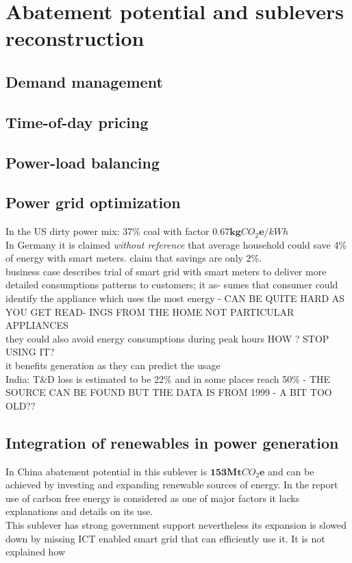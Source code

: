 \documentclass[11pt, twocolumn]{article}
\begin{document}
\section{Abatement potential and sublevers reconstruction}
\subsection{Demand management}
\subsection{Time-of-day pricing}
\subsection{Power-load balancing}
\subsection{Power grid optimization}

In the US dirty power mix: 37\% coal with factor $\mathbf{0.67} \mathbf{kg}CO_2\mathbf{e} / kWh$\\

In Germany it is claimed \emph{without reference} that average household could save 4\% of energy with smart meters. \citep{bbc:smartmeters} claim that savings are only 2\%.\\
business case describes trial of smart grid with smart meters to deliver more detailed consumptions patterns to customers; it as- sumes that consumer could identify the appliance which uses the most energy - CAN BE QUITE HARD AS YOU GET READ- INGS FROM THE HOME NOT PARTICULAR APPLIANCES\\
they could also avoid energy consumptions during peak hours HOW ? STOP USING IT?\\
it benefits generation as they can predict the usage\\

India: T\&D loss is estimated to be 22\% and in some places reach 50\% - THE SOURCE CAN BE FOUND BUT THE DATA IS FROM 1999 - A BIT TOO OLD??\\


\newpage
\subsection{Integration of renewables in power generation}
In China abatement potential in this sublever is $\mathbf{153} \mathbf{Mt}CO_2\mathbf{e}$ and can be achieved by investing and expanding renewable sources of energy. In the report use of carbon free energy is considered as one of major factors it lacks explanations and details on its use.\\
This sublever has strong government support nevertheless its expansion is slowed down by missing ICT enabled smart grid that can efficiently use it. It is not explained how 
\end{document}
